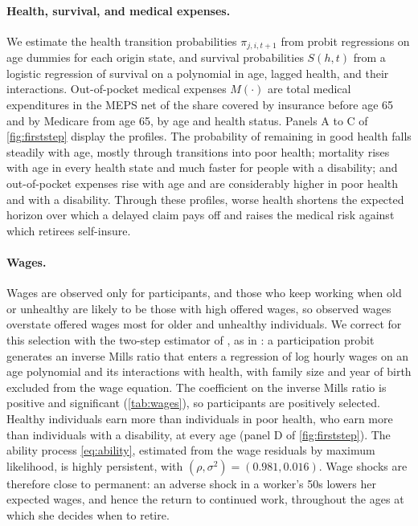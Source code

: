 \paragraph{Health, survival, and medical expenses.} We estimate the health transition probabilities $\pi_{j,i,t+1}$ from probit regressions on age dummies for each origin state, and survival probabilities $S(h,t)$ from a logistic regression of survival on a polynomial in age, lagged health, and their interactions. Out-of-pocket medical expenses $M(\cdot)$ are total medical expenditures in the MEPS net of the share covered by insurance before age 65 and by Medicare from age 65, by age and health status. Panels A to C of \autoref{fig:firststep} display the profiles. The probability of remaining in good health falls steadily with age, mostly through transitions into poor health; mortality rises with age in every health state and much faster for people with a disability; and out-of-pocket expenses rise with age and are considerably higher in poor health and with a disability. Through these profiles, worse health shortens the expected horizon over which a delayed claim pays off and raises the medical risk against which retirees self-insure.

\paragraph{Wages.} Wages are observed only for participants, and those who keep working when old or unhealthy are likely to be those with high offered wages, so observed wages overstate offered wages most for older and unhealthy individuals. We correct for this selection with the two-step estimator of \citet{Heckman1976}, as in \citet{Guner2012}: a participation probit generates an inverse Mills ratio that enters a regression of log hourly wages on an age polynomial and its interactions with health, with family size and year of birth excluded from the wage equation. The coefficient on the inverse Mills ratio is positive and significant (\autoref{tab:wages}), so participants are positively selected. Healthy individuals earn more than individuals in poor health, who earn more than individuals with a disability, at every age (panel D of \autoref{fig:firststep}). The ability process \eqref{eq:ability}, estimated from the wage residuals by maximum likelihood, is highly persistent, with $(\rho,\sigma^2)=(0.981,0.016)$. Wage shocks are therefore close to permanent: an adverse shock in a worker's 50s lowers her expected wages, and hence the return to continued work, throughout the ages at which she decides when to retire.

